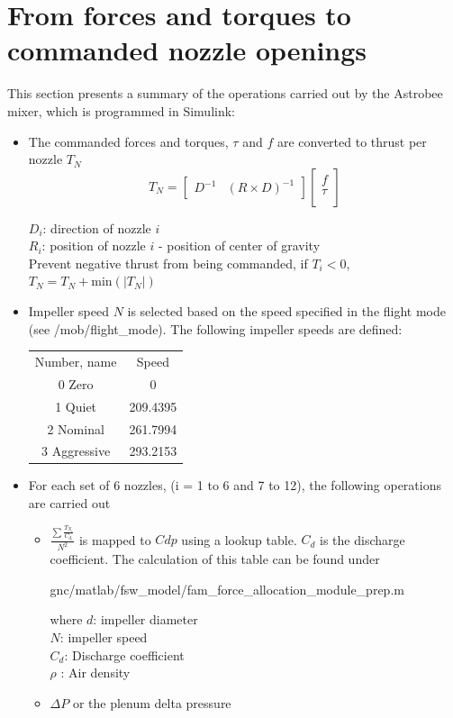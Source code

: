 \documentclass{article}
\begin{document}
\section{From forces and torques to commanded nozzle openings }\label{appendix:D}
This section presents a summary of the operations carried out by the Astrobee mixer, which is programmed in Simulink:
\begin{itemize}
\item The commanded forces and torques, $\tau$ and $f$ are converted to thrust per nozzle $T_N$
\begin{equation}
T_N = \left[\begin{array}{cc}
D^{-1} & \left(R\times D\right)^{-1}\end{array}\right]\begin{bmatrix}
f \\ 
\tau\\
\end{bmatrix}
\end{equation}

$D_i$: direction of nozzle $i$\\
$R_i$: position of nozzle $i$ - position of center of gravity\\
Prevent negative thrust from being commanded, if $T_i<0$, $T_N = T_N + \mathrm{min}(\vert T_N \vert)$

\item Impeller speed $N$ is selected based on the speed specified in the flight mode (see /mob/flight\_mode). The following impeller speeds are defined:
\begin{center}
\begin{tabular}{ c c }
Number, name & Speed \\
0 Zero & 0 \\ 
1 Quiet & 209.4395  \\ 
2  Nominal & 261.7994  \\  
3 Aggressive & 293.2153     
\end{tabular}
\end{center}

\item For each set of 6 nozzles, (i = 1 to 6 and 7 to 12), the following operations are carried out
\begin{itemize}
    \item $\frac{\sum\frac{ T_N_i}{  C_d_i}}{N^2}$ is mapped to $Cdp$ using a lookup table. $C_d$ is the discharge coefficient. The calculation of this table can be found under \begin{markdown}
    gnc/matlab/fsw_model/fam_force_allocation_module_prep.m     \end{markdown}
        where $d$: impeller diameter\\
$N$: impeller speed\\
$C_d$: Discharge coefficient\\
$\rho$ : Air density\\
    \item $\Delta P$ or the plenum delta pressure


\end{itemize}
\end{itemize}
\end{document}
